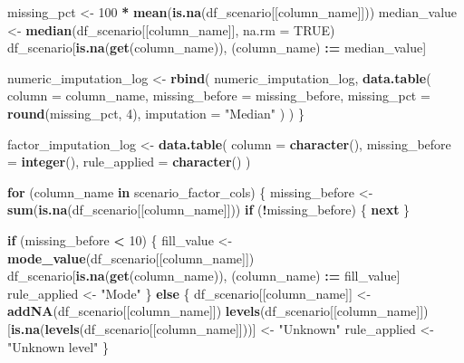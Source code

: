 \documentclass[
]{article}
\newenvironment{Shaded}{\begin{snugshade}}{\end{snugshade}}
\newcommand{\AttributeTok}[1]{\textcolor[rgb]{0.13,0.29,0.53}{#1}}
\newcommand{\ConstantTok}[1]{\textcolor[rgb]{0.56,0.35,0.01}{#1}}
\newcommand{\ControlFlowTok}[1]{\textcolor[rgb]{0.13,0.29,0.53}{\textbf{#1}}}
\newcommand{\DecValTok}[1]{\textcolor[rgb]{0.00,0.00,0.81}{#1}}
\newcommand{\FunctionTok}[1]{\textcolor[rgb]{0.13,0.29,0.53}{\textbf{#1}}}
\newcommand{\NormalTok}[1]{#1}
\newcommand{\OtherTok}[1]{\textcolor[rgb]{0.56,0.35,0.01}{#1}}
\newcommand{\SpecialCharTok}[1]{\textcolor[rgb]{0.81,0.36,0.00}{\textbf{#1}}}
\newcommand{\StringTok}[1]{\textcolor[rgb]{0.31,0.60,0.02}{#1}}
\begin{document}
\begin{Shaded}
\begin{Highlighting}[]
\NormalTok{  missing\_pct }\OtherTok{\textless{}{-}} \DecValTok{100} \SpecialCharTok{*} \FunctionTok{mean}\NormalTok{(}\FunctionTok{is.na}\NormalTok{(df\_scenario[[column\_name]]))}
\NormalTok{  median\_value }\OtherTok{\textless{}{-}} \FunctionTok{median}\NormalTok{(df\_scenario[[column\_name]], }\AttributeTok{na.rm =} \ConstantTok{TRUE}\NormalTok{)}
\NormalTok{  df\_scenario[}\FunctionTok{is.na}\NormalTok{(}\FunctionTok{get}\NormalTok{(column\_name)), (column\_name) }\SpecialCharTok{:=}\NormalTok{ median\_value]}

\NormalTok{  numeric\_imputation\_log }\OtherTok{\textless{}{-}} \FunctionTok{rbind}\NormalTok{(}
\NormalTok{    numeric\_imputation\_log,}
    \FunctionTok{data.table}\NormalTok{(}
      \AttributeTok{column =}\NormalTok{ column\_name,}
      \AttributeTok{missing\_before =}\NormalTok{ missing\_before,}
      \AttributeTok{missing\_pct =} \FunctionTok{round}\NormalTok{(missing\_pct, }\DecValTok{4}\NormalTok{),}
      \AttributeTok{imputation =} \StringTok{"Median"}
\NormalTok{    )}
\NormalTok{  )}
\NormalTok{\}}

\NormalTok{factor\_imputation\_log }\OtherTok{\textless{}{-}} \FunctionTok{data.table}\NormalTok{(}
  \AttributeTok{column =} \FunctionTok{character}\NormalTok{(),}
  \AttributeTok{missing\_before =} \FunctionTok{integer}\NormalTok{(),}
  \AttributeTok{rule\_applied =} \FunctionTok{character}\NormalTok{()}
\NormalTok{)}

\ControlFlowTok{for}\NormalTok{ (column\_name }\ControlFlowTok{in}\NormalTok{ scenario\_factor\_cols) \{}
\NormalTok{  missing\_before }\OtherTok{\textless{}{-}} \FunctionTok{sum}\NormalTok{(}\FunctionTok{is.na}\NormalTok{(df\_scenario[[column\_name]]))}
  \ControlFlowTok{if}\NormalTok{ (}\SpecialCharTok{!}\NormalTok{missing\_before) \{}
    \ControlFlowTok{next}
\NormalTok{  \}}

  \ControlFlowTok{if}\NormalTok{ (missing\_before }\SpecialCharTok{\textless{}} \DecValTok{10}\NormalTok{) \{}
\NormalTok{    fill\_value }\OtherTok{\textless{}{-}} \FunctionTok{mode\_value}\NormalTok{(df\_scenario[[column\_name]])}
\NormalTok{    df\_scenario[}\FunctionTok{is.na}\NormalTok{(}\FunctionTok{get}\NormalTok{(column\_name)), (column\_name) }\SpecialCharTok{:=}\NormalTok{ fill\_value]}
\NormalTok{    rule\_applied }\OtherTok{\textless{}{-}} \StringTok{"Mode"}
\NormalTok{  \} }\ControlFlowTok{else}\NormalTok{ \{}
\NormalTok{    df\_scenario[[column\_name]] }\OtherTok{\textless{}{-}} \FunctionTok{addNA}\NormalTok{(df\_scenario[[column\_name]])}
    \FunctionTok{levels}\NormalTok{(df\_scenario[[column\_name]])[}\FunctionTok{is.na}\NormalTok{(}\FunctionTok{levels}\NormalTok{(df\_scenario[[column\_name]]))] }\OtherTok{\textless{}{-}} \StringTok{"Unknown"}
\NormalTok{    rule\_applied }\OtherTok{\textless{}{-}} \StringTok{"Unknown level"}
\NormalTok{  \}}


\end{Highlighting}
\end{Shaded}
\end{document}
